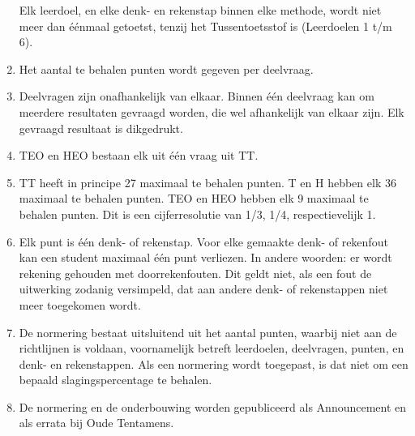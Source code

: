 \documentclass{article}
\begin{document}
\begin{enumerate}
    Elk leerdoel, en elke denk- en rekenstap binnen elke methode, wordt niet meer dan éénmaal getoetst, tenzij het Tussentoetsstof is (Leerdoelen 1 t/m 6).

    \item Het aantal te behalen punten wordt gegeven per deelvraag.

    \item Deelvragen zijn onafhankelijk van elkaar. Binnen één deelvraag kan om meerdere resultaten gevraagd worden, die wel afhankelijk van elkaar zijn. Elk gevraagd resultaat is dikgedrukt.

    \item TEO en HEO bestaan elk uit één vraag uit TT.

    \item TT heeft in principe 27 maximaal te behalen punten. T en H hebben elk 36 maximaal te behalen punten. TEO en HEO hebben elk 9 maximaal te behalen punten. Dit is een cijferresolutie van 1/3, 1/4, respectievelijk 1.

    \item Elk punt is één denk- of rekenstap. Voor elke gemaakte denk- of rekenfout kan een student maximaal één punt verliezen. In andere woorden: er wordt rekening gehouden met doorrekenfouten. Dit geldt niet, als een fout de uitwerking zodanig versimpeld, dat aan andere denk- of rekenstappen niet meer toegekomen wordt.

    \item De normering bestaat uitsluitend uit het aantal punten, waarbij niet aan de richtlijnen is voldaan, voornamelijk betreft leerdoelen, deelvragen, punten, en denk- en rekenstappen. Als een normering wordt toegepast, is dat niet om een bepaald slagingspercentage te behalen.

    \item De normering en de onderbouwing worden gepubliceerd als Announcement en als errata bij Oude Tentamens.
    
\end{enumerate}

\newpage
\end{document}
